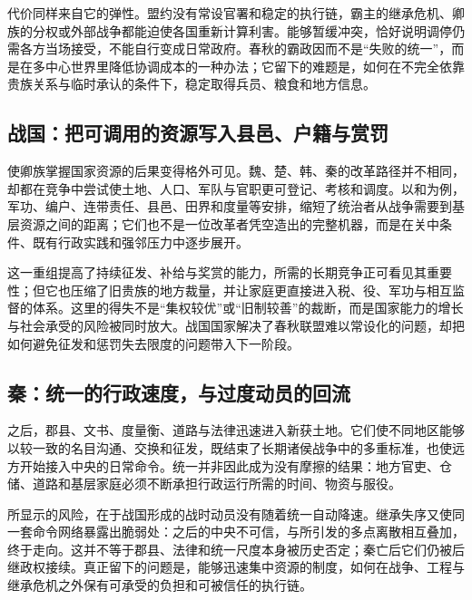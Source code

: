 代价同样来自它的弹性。盟约没有常设官署和稳定的执行链，霸主的继承危机、卿族的分权或外部战争都能迫使各国重新计算利害。能够暂缓冲突，恰好说明调停仍需各方当场接受，不能自行变成日常政府。春秋的霸政因而不是“失败的统一”，而是在多中心世界里降低协调成本的一种办法；它留下的难题是，如何在不完全依靠贵族关系与临时承认的条件下，稳定取得兵员、粮食和地方信息。

\subsection{战国：把可调用的资源写入县邑、户籍与赏罚}

使卿族掌握国家资源的后果变得格外可见。魏、楚、韩、秦的改革路径并不相同，却都在竞争中尝试使土地、人口、军队与官职更可登记、考核和调度。以和为例，军功、编户、连带责任、县邑、田界和度量等安排，缩短了统治者从战争需要到基层资源之间的距离；它们也不是一位改革者凭空造出的完整机器，而是在关中条件、既有行政实践和强邻压力中逐步展开。

这一重组提高了持续征发、补给与奖赏的能力，所需的长期竞争正可看见其重要性；但它也压缩了旧贵族的地方裁量，并让家庭更直接进入税、役、军功与相互监督的体系。这里的得失不是“集权较优”或“旧制较善”的裁断，而是国家能力的增长与社会承受的风险被同时放大。战国国家解决了春秋联盟难以常设化的问题，却把如何避免征发和惩罚失去限度的问题带入下一阶段。

\subsection{秦：统一的行政速度，与过度动员的回流}

之后，郡县、文书、度量衡、道路与法律迅速进入新获土地。它们使不同地区能够以较一致的名目沟通、交换和征发，既结束了长期诸侯战争中的多重标准，也使远方开始接入中央的日常命令。统一并非因此成为没有摩擦的结果：地方官吏、仓储、道路和基层家庭必须不断承担行政运行所需的时间、物资与服役。

所显示的风险，在于战国形成的战时动员没有随着统一自动降速。继承失序又使同一套命令网络暴露出脆弱处：之后的中央不可信，与所引发的多点离散相互叠加，终于走向。这并不等于郡县、法律和统一尺度本身被历史否定；秦亡后它们仍被后继政权接续。真正留下的问题是，能够迅速集中资源的制度，如何在战争、工程与继承危机之外保有可承受的负担和可被信任的执行链。

